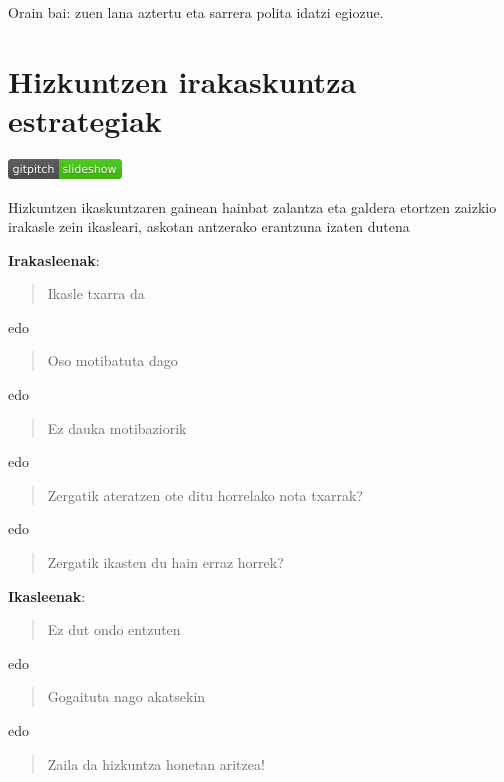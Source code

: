 \documentclass[
]{book}
\begin{document}
Orain bai: zuen lana aztertu eta sarrera polita idatzi egiozue.

\hypertarget{hizkuntzen-irakaskuntza-estrategiak}{%
\chapter{Hizkuntzen irakaskuntza estrategiak}\label{hizkuntzen-irakaskuntza-estrategiak}}

\href{../Diapoak/06_diapo_estrategiak.html}{\includegraphics{assets/badge.png}}

Hizkuntzen ikaskuntzaren gainean hainbat zalantza eta galdera etortzen zaizkio irakasle zein ikasleari, askotan antzerako erantzuna izaten dutena

\textbf{Irakasleenak}:

\begin{quote}
Ikasle txarra da
\end{quote}

edo

\begin{quote}
Oso motibatuta dago
\end{quote}

edo

\begin{quote}
Ez dauka motibaziorik
\end{quote}

edo

\begin{quote}
Zergatik ateratzen ote ditu horrelako nota txarrak?
\end{quote}

edo

\begin{quote}
Zergatik ikasten du hain erraz horrek?
\end{quote}

\textbf{Ikasleenak}:

\begin{quote}
Ez dut ondo entzuten
\end{quote}

edo

\begin{quote}
Gogaituta nago akatsekin
\end{quote}

edo

\begin{quote}
Zaila da hizkuntza honetan aritzea!
\end{quote}
\end{document}
